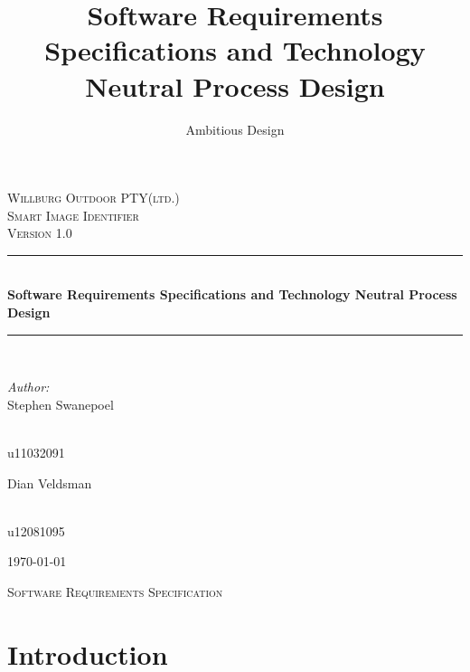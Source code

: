 \documentclass[a4paper,12pt]{report}
\author{Ambitious Design}
\title{ Software Requirements Specifications and Technology Neutral Process Design}
\newcommand{\HRule}{\rule{\linewidth}{0.5mm}}
\begin{document}
\setlength{\parskip}{6pt}

\begin{titlepage}

\begin{center}
\textsc{\LARGE Willburg Outdoor PTY(ltd.)}\\[1.5cm]
\textsc{\Large Smart Image Identifier }\\[1.0cm]
\textsc{\Large Version 1.0 }\\[0.5cm]
\HRule \\[0.4cm]
{ \huge \bfseries  Software Requirements Specifications and Technology Neutral Process Design}\\[0.4cm]
\HRule \\[0.4cm]
\begin{minipage}{0.4\textwidth}
\begin{flushleft} \large
\emph{Author:}\\
Stephen {Swanepoel}
\end{flushleft}
\end{minipage}
\begin{minipage}{0.4\textwidth}
\begin{flushright} \large
\emph{} \\
u11032091
\end{flushright}
\end{minipage}
\begin{minipage}{0.4\textwidth}
\begin{flushleft} \large
Dian {Veldsman}
\end{flushleft}
\end{minipage}
\begin{minipage}{0.4\textwidth}
\begin{flushright} \large
\emph{} \\
u12081095
\end{flushright}
\end{minipage}


{\large \today}
\end{center}
\end{titlepage}
\footnotesize
\normalsize

\renewcommand{\thesection}{\arabic{section}}
\newpage
\begin{center}
\textsc{\LARGE Software Requirements Specification}\\[1.5cm]
\end{center}

\section {Introduction}
\end{document}
